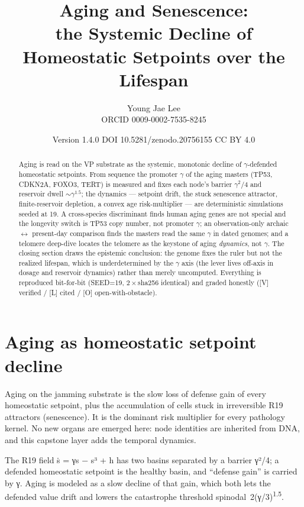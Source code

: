 \documentclass[11pt]{article}
\title{\sffamily\bfseries Aging and Senescence:\\[2pt]
  {\large\mdseries the Systemic Decline of Homeostatic Setpoints over the Lifespan}}
\author{Young Jae Lee \\ \small ORCID 0009-0002-7535-8245}
\date{\small Version 1.4.0 \;\textbullet\; DOI 10.5281/zenodo.20756155 \;\textbullet\; CC BY 4.0 \;\textbullet\; 2026}
\begin{document}
\maketitle
\thispagestyle{empty}
\begin{abstract}\noindent
Aging is read on the VP substrate as the systemic, monotonic decline of $\gamma$-defended homeostatic
setpoints. From sequence the promoter $\gamma$ of the aging masters (TP53, CDKN2A, FOXO3, TERT) is measured
and fixes each node's barrier $\gamma^2/4$ and reservoir dwell $\sim\gamma^{1.5}$; the dynamics --- setpoint
drift, the stuck senescence attractor, finite-reservoir depletion, a convex age risk-multiplier --- are
deterministic simulations seeded at 19. A cross-species discriminant finds human aging genes are not special
and the longevity switch is TP53 copy number, not promoter $\gamma$; an observation-only archaic$\leftrightarrow$
present-day comparison finds the masters read the same $\gamma$ in dated genomes; and a telomere deep-dive
locates the telomere as the keystone of aging \emph{dynamics}, not $\gamma$. The closing section draws the
epistemic conclusion: the genome fixes the ruler but not the realized lifespan, which is underdetermined by
the $\gamma$ axis (the lever lives off-axis in dosage and reservoir dynamics) rather than merely uncomputed.
Everything is reproduced bit-for-bit (SEED=19, $2\times$sha256 identical) and graded honestly
([V] verified / [L] cited / [O] open-with-obstacle).
\end{abstract}
\vspace{1em}
\tableofcontents
\clearpage


\section{Aging as homeostatic setpoint decline}

\begin{answerbox}Aging on the jamming substrate is the slow loss of defense gain of every homeostatic setpoint, plus the accumulation of cells stuck in irreversible R19 attractors (senescence). It is the dominant risk multiplier for every pathology kernel. No new organs are emerged here: node identities are inherited from DNA, and this capstone layer adds the temporal dynamics.\end{answerbox}

\begin{abstractbox}The R19 field ṡ = γs − s³ + h has two basins separated by a barrier γ²/4; a defended homeostatic setpoint is the healthy basin, and “defense gain” is carried by γ. Aging is modeled as a slow decline of that gain, which both lets the defended value drift and lowers the catastrophe threshold spinodal 2(γ/3)\textsuperscript{1.5}.\end{abstractbox}
\end{document}
